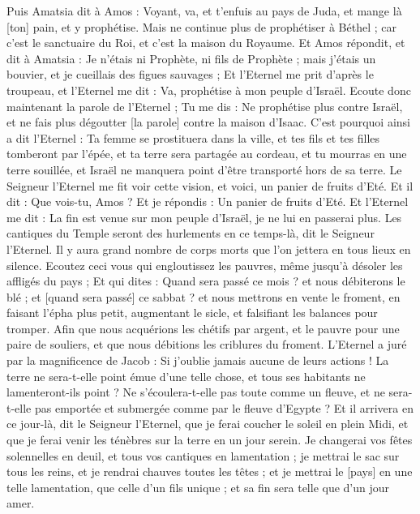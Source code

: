 \begin{multicols}{2}
Puis Amatsia dit à Amos : Voyant, va, et t'enfuis au pays de Juda, et mange là [ton] pain, et y prophétise.
Mais ne continue plus de prophétiser à Béthel ; car c'est le sanctuaire du Roi, et c'est la maison du Royaume.
Et Amos répondit, et dit à Amatsia : Je n'étais ni Prophète, ni fils de Prophète ; mais j'étais un bouvier, et je cueillais des figues sauvages ;
Et l'Eternel me prit d'après le troupeau, et l'Eternel me dit : Va, prophétise à mon peuple d'Israël.
Ecoute donc maintenant la parole de l'Eternel ; Tu me dis : Ne prophétise plus contre Israël, et ne fais plus dégoutter [la parole] contre la maison d'Isaac.
C'est pourquoi ainsi a dit l'Eternel : Ta femme se prostituera dans la ville, et tes fils et tes filles tomberont par l'épée, et ta terre sera partagée au cordeau, et tu mourras en une terre souillée, et Israël ne manquera point d'être transporté hors de sa terre.
\VerseOne{}Le Seigneur l'Eternel me fit voir cette vision, et voici, un panier de fruits d'Eté.
Et il dit : Que vois-tu, Amos ? Et je répondis : Un panier de fruits d'Eté. Et l'Eternel me dit : La fin est venue sur mon peuple d'Israël, je ne lui en passerai plus.
Les cantiques du Temple seront des hurlements en ce temps-là, dit le Seigneur l'Eternel. Il y aura grand nombre de corps morts que l'on jettera en tous lieux en silence.
Ecoutez ceci vous qui engloutissez les pauvres, même jusqu'à désoler les affligés du pays ;
Et qui dites : Quand sera passé ce mois ? et nous débiterons le blé ; et [quand sera passé] ce sabbat ? et nous mettrons en vente le froment, en faisant l'épha plus petit, augmentant le sicle, et falsifiant les balances pour tromper.
Afin que nous acquérions les chétifs par argent, et le pauvre pour une paire de souliers, et que nous débitions les criblures du froment.
L'Eternel a juré par la magnificence de Jacob : Si j'oublie jamais aucune de leurs actions !
La terre ne sera-t-elle point émue d'une telle chose, et tous ses habitants ne lamenteront-ils point ? Ne s'écoulera-t-elle pas toute comme un fleuve, et ne sera-t-elle pas emportée et submergée comme par le fleuve d'Egypte ?
Et il arrivera en ce jour-là, dit le Seigneur l'Eternel, que je ferai coucher le soleil en plein Midi, et que je ferai venir les ténèbres sur la terre en un jour serein.
Je changerai vos fêtes solennelles en deuil, et tous vos cantiques en lamentation ; je mettrai le sac sur tous les reins, et je rendrai chauves toutes les têtes ; et je mettrai le [pays] en une telle lamentation, que celle d'un fils unique ; et sa fin sera telle que d'un jour amer.

\end{multicols}
